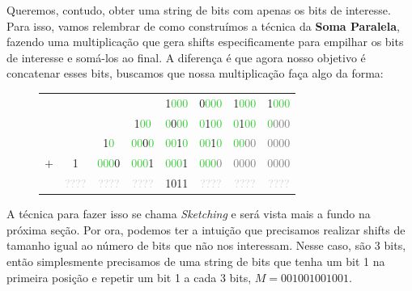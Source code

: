 Queremos, contudo, obter uma string de bits com apenas os bits de interesse.
Para isso, vamos relembrar de como construímos a técnica da \textbf{Soma
Paralela}, fazendo uma multiplicação que gera shifts especificamente para
empilhar os bits de interesse e somá-los ao final. A diferença é que agora nosso
objetivo é concatenar esses bits, buscamos que nossa multiplicação faça algo da
forma:

\begin{figure}[h]
\bf \Large \centering
\begin{tabular}{cccccccc}
& & & & \textcolor{PineGreen}{1}\textcolor{LimeGreen}{000} &
\textcolor{PineGreen}{0}\textcolor{LimeGreen}{000} &
\textcolor{PineGreen}{1}\textcolor{LimeGreen}{000} &
\textcolor{PineGreen}{1}\textcolor{LimeGreen}{000} \\
& & & \textcolor{PineGreen}{\phantom{0}1}\textcolor{LimeGreen}{00} & 
\textcolor{LimeGreen}{0}\textcolor{PineGreen}{0}\textcolor{LimeGreen}{00} &
\textcolor{LimeGreen}{0}\textcolor{PineGreen}{1}\textcolor{LimeGreen}{00} &
\textcolor{LimeGreen}{0}\textcolor{PineGreen}{1}\textcolor{LimeGreen}{00} &
\textcolor{LimeGreen}{0}\textcolor{gray}{000} \\
& & \textcolor{PineGreen}{\phantom{00}1}\textcolor{LimeGreen}{0} &
\textcolor{LimeGreen}{00}\textcolor{PineGreen}{0}\textcolor{LimeGreen}{0}  &
\textcolor{LimeGreen}{00}\textcolor{PineGreen}{1}\textcolor{LimeGreen}{0}  &
\textcolor{LimeGreen}{00}\textcolor{PineGreen}{1}\textcolor{LimeGreen}{0}  &
\textcolor{LimeGreen}{00}\textcolor{gray}{00} &
\textcolor{gray}{0000} \\
$+$ & \textcolor{PineGreen}{\phantom{000}1} &
\textcolor{LimeGreen}{000}\textcolor{PineGreen}{0} &
\textcolor{LimeGreen}{000}\textcolor{PineGreen}{1} &
\textcolor{LimeGreen}{000}\textcolor{PineGreen}{1} &
\textcolor{LimeGreen}{000}\textcolor{gray}{0} &
\textcolor{gray}{0000} &
\textcolor{gray}{0000} \\
\hline
& \textcolor{lightgray}{????} &
\textcolor{lightgray}{????} & 
\textcolor{lightgray}{????} & 
\textcolor{PineGreen}{1011} & 
\textcolor{lightgray}{????} &
\textcolor{lightgray}{????} & 
\textcolor{lightgray}{????}
\end{tabular}
\end{figure}

A técnica para fazer isso se chama \textit{Sketching} e será vista mais a fundo
na próxima seção. Por ora, podemos ter a intuição que precisamos realizar shifts
de tamanho igual ao número de bits que não nos interessam. Nesse caso, são 3
bits, então simplesmente precisamos de uma string de bits que tenha um bit 1 na
primeira posição e repetir um bit 1 a cada 3 bits, $M=001001001001$.


